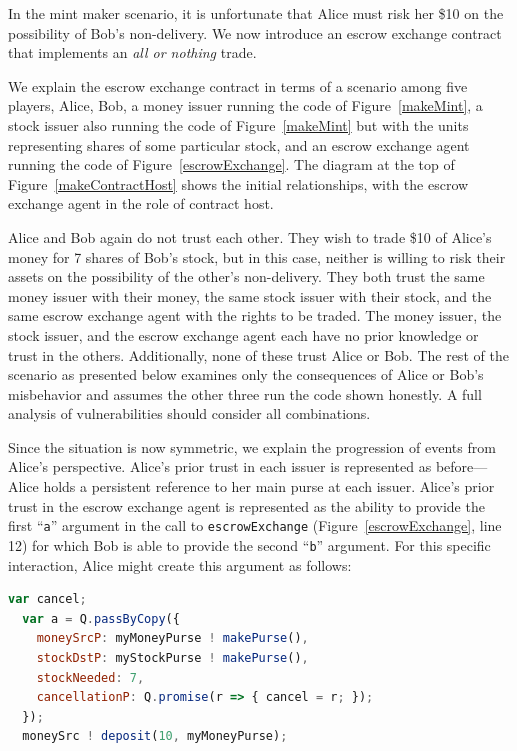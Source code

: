 \documentclass{llncs}
\begin{document}
In the mint maker scenario, it is unfortunate that Alice must risk her \$10 on the possibility of Bob's non-delivery. We now introduce an escrow exchange contract that implements an \emph{all or nothing} trade.

We explain the escrow exchange contract in terms of a scenario among five players, Alice, Bob, a money issuer running the code of Figure~\ref{makeMint}, a stock issuer also running the code of Figure~\ref{makeMint} but with the units representing shares of some particular stock, and an escrow exchange agent running the code of Figure~\ref{escrowExchange}. The diagram at the top of Figure~\ref{makeContractHost} shows the initial relationships, with the escrow exchange agent in the role of contract host.

Alice and Bob again do not trust each other. They wish to trade \$10 of Alice's money for 7 shares of Bob's stock, but in this case, neither is willing to risk their assets on the possibility of the other's non-delivery. They both trust the same money issuer with their money, the same stock issuer with their stock, and the same escrow exchange agent with the rights to be traded. The money issuer, the stock issuer, and the escrow exchange agent each have no prior knowledge or trust in the others. Additionally, none of these trust Alice or Bob. The rest of the scenario as presented below examines only the consequences of Alice or Bob's misbehavior and assumes the other three run the code shown honestly. A full analysis of vulnerabilities should consider all combinations.

Since the situation is now symmetric, we explain the progression of events from Alice's perspective. Alice's prior trust in each issuer is represented as before---Alice holds a persistent reference to her main purse at each issuer. Alice's prior trust in the escrow exchange agent is represented as the ability to provide the first ``{\tt a}'' argument in the call to {\tt escrowExchange} (Figure~\ref{escrowExchange}, line 12) for which Bob is able to provide the second ``{\tt b}'' argument. For this specific interaction, Alice might create this argument as follows:

\begin{lstlisting}[language=JavaScript,numbers=none]
  var cancel;
  var a = Q.passByCopy({
    moneySrcP: myMoneyPurse ! makePurse(),
    stockDstP: myStockPurse ! makePurse(),
    stockNeeded: 7,
    cancellationP: Q.promise(r => { cancel = r; });
  });
  moneySrc ! deposit(10, myMoneyPurse);
\end{lstlisting}
\end{document}
